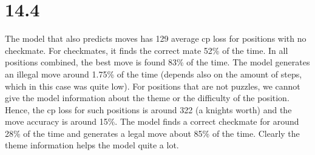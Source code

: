 \documentclass[a4paper, 12pt]{article}
\begin{document}
\section{14.4}

The model that also predicts moves has 129 average cp loss for positions with no checkmate. For checkmates, it finds the correct mate 52\% of the time. In all positions combined, the best move is found 83\% of the time. The model generates an illegal move around 1.75\% of the time (depends also on the amount of steps, which in this case was quite low). For positions that are not puzzles, we cannot give the model information about the theme or the difficulty of the position. Hence, the cp loss for such positions is around 322 (a knights worth) and the move accuracy is around 15\%. The model finds a correct checkmate for around 28\% of the time and generates a legal move about 85\% of the time. Clearly the theme information helps the model quite a lot.

\clearpage


\end{document}
